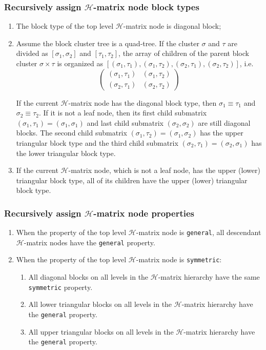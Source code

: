 \documentclass[11pt, a4paper]{article}
\begin{document}
\subsubsection{Recursively assign $\mathcal{H}$-matrix node block types}
\begin{enumerate}
\item The block type of the top level $\mathcal{H}$-matrix node is diagonal block;
\item Assume the block cluster tree is a quad-tree. If the cluster $\sigma$ and $\tau$
  are divided as $[\sigma_1, \sigma_2]$ and $[\tau_1, \tau_2]$, the array of children of
  the parent block cluster $\sigma\times\tau$ is organized as
  $[(\sigma_1, \tau_1), (\sigma_1, \tau_2), (\sigma_2, \tau_1), (\sigma_2, \tau_2)]$,
  i.e.
  $$
  \begin{pmatrix}
    (\sigma_1, \tau_1) & (\sigma_1, \tau_2) \\
    (\sigma_2, \tau_1) & (\sigma_2, \tau_2)
  \end{pmatrix}
  $$

  If the current $\mathcal{H}$-matrix node has the diagonal block type, then
  $\sigma_1 \equiv \tau_1$ and $\sigma_2 \equiv \tau_2$. If it is not a leaf node, then
  its first child submatrix $(\sigma_1, \tau_1) = (\sigma_1, \sigma_1)$ and last child
  submatrix $(\sigma_2, \sigma_2)$ are still diagonal blocks. The second child submatrix
  $(\sigma_1, \tau_2) = (\sigma_1, \sigma_2)$ has the upper triangular block type and
  the third child submatrix $(\sigma_2,\tau_1) = (\sigma_2,\sigma_1)$ has the lower
  triangular block type.
\item If the current $\mathcal{H}$-matrix node, which is not a leaf node, has the upper
  (lower) triangular block type, all of its children have the upper (lower) triangular
  block type.
\end{enumerate}  

\subsubsection{Recursively assign $\mathcal{H}$-matrix node properties}

\begin{enumerate}
\item When the property of the top level $\mathcal{H}$-matrix node is \texttt{general}, all descendant
  $\mathcal{H}$-matrix nodes have the \texttt{general} property.
\item When the property of the top level $\mathcal{H}$-matrix node is \texttt{symmetric}:
  \begin{enumerate}
  \item All diagonal blocks on all levels in the $\mathcal{H}$-matrix hierarchy have the
    same \texttt{symmetric} property.
  \item All lower triangular blocks on all levels in the $\mathcal{H}$-matrix hierarchy
    have the \texttt{general} property.
  \item All upper triangular blocks on all levels in the $\mathcal{H}$-matrix hierarchy
    have the \texttt{general} property.
  \end{enumerate}  
\end{enumerate}
\end{document}
